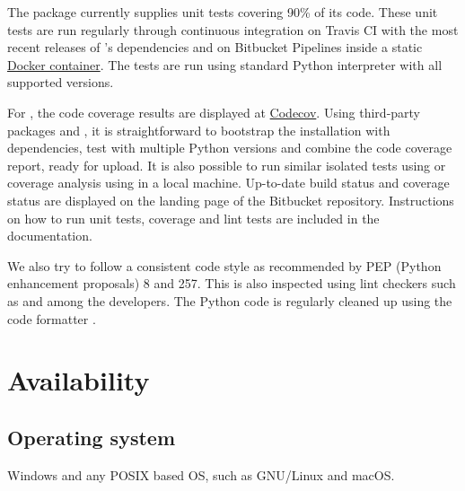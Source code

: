 
The package  currently supplies unit tests covering 90\% of its
code.  These unit tests are run regularly through continuous integration on Travis
CI with the most recent releases of 's dependencies and on
Bitbucket Pipelines inside a static
\href{https://hub.docker.com/u/fluiddyn}{Docker container}.  The tests are run
using standard Python interpreter with all supported versions.

For , the code coverage results are displayed at
\href{https://codecov.io/bb/fluiddyn/fluidfft}{Codecov}.  Using third-party
packages  and , it is straightforward to bootstrap the
installation with dependencies, test with multiple Python versions and combine the
code coverage report, ready for upload. It is also possible to run similar
isolated tests using  or coverage analysis using  in a
local machine.  Up-to-date build status and coverage status are displayed on the
landing page of the Bitbucket repository.  Instructions on how to run unit tests,
coverage and lint tests are included in the documentation.

We also try to follow a consistent code style as recommended by PEP (Python
enhancement proposals) 8 and 257. This is also inspected using lint checkers such
as  and  among the developers.  The Python
code is regularly cleaned up using the code formatter .


\section{Availability}
\vspace{0.5cm}
\subsection{Operating system}


Windows and any POSIX based OS, such as GNU/Linux and macOS.

